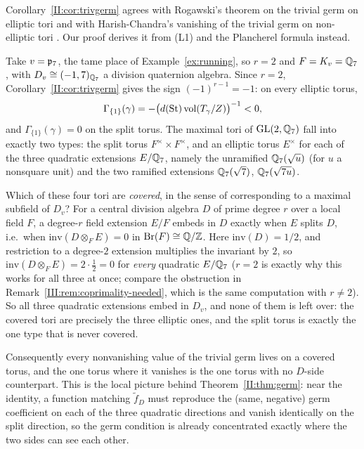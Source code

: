 \begin{remark}
Corollary~\ref{II:cor:trivgerm} agrees with Rogawski's theorem on the trivial germ on elliptic tori \cite{Rog81} and with Harish-Chandra's vanishing of the trivial germ on non-elliptic tori \cite{HC78}. Our proof derives it from (L1) and the Plancherel formula instead.
\end{remark}

\begin{example}\label{II:ex:trivgerm}
Take $v=\mathfrak p_7$, the tame place of Example~\ref{ex:running}, so $r=2$ and $F=K_v=\mathbb{Q}_7$, with $D_v\cong(-1,7)_{\mathbb{Q}_7}$ a division quaternion algebra. Since $r=2$, Corollary~\ref{II:cor:trivgerm} gives the sign $(-1)^{r-1}=-1$: on every elliptic torus,
\[
\Gamma_{\{1\}}(\gamma)=-\bigl(d(\mathrm{St})\operatorname{vol}(T_\gamma/Z)\bigr)^{-1}<0,
\]
and $\Gamma_{\{1\}}(\gamma)=0$ on the split torus. The maximal tori of $\mathrm{GL}(2,\mathbb{Q}_7)$ fall into exactly two types: the split torus $F^\times\times F^\times$, and an elliptic torus $E^\times$ for each of the three quadratic extensions $E/\mathbb{Q}_7$, namely the unramified $\mathbb{Q}_7(\sqrt u)$ (for $u$ a nonsquare unit) and the two ramified extensions $\mathbb{Q}_7(\sqrt7)$, $\mathbb{Q}_7(\sqrt{7u})$.

Which of these four tori are \emph{covered}, in the sense of corresponding to a maximal subfield of $D_v$? For a central division algebra $D$ of prime degree $r$ over a local field $F$, a degree-$r$ field extension $E/F$ embeds in $D$ exactly when $E$ splits $D$, i.e.\ when $\mathrm{inv}(D\otimes_FE)=0$ in $\mathrm{Br}(F)\cong\mathbb{Q}/\mathbb{Z}$. Here $\mathrm{inv}(D)=1/2$, and restriction to a degree-$2$ extension multiplies the invariant by $2$, so $\mathrm{inv}(D\otimes_FE)=2\cdot\tfrac12=0$ for \emph{every} quadratic $E/\mathbb{Q}_7$ ($r=2$ is exactly why this works for all three at once; compare the obstruction in Remark~\ref{III:rem:coprimality-needed}, which is the same computation with $r\ne2$). So all three quadratic extensions embed in $D_v$, and none of them is left over: the covered tori are precisely the three elliptic ones, and the split torus is exactly the one type that is never covered.

Consequently every nonvanishing value of the trivial germ lives on a covered torus, and the one torus where it vanishes is the one torus with no $D$-side counterpart. This is the local picture behind Theorem~\ref{II:thm:germ}: near the identity, a function matching $\tilde f_D$ must reproduce the (same, negative) germ coefficient on each of the three quadratic directions and vanish identically on the split direction, so the germ condition is already concentrated exactly where the two sides can see each other.
\end{example}

